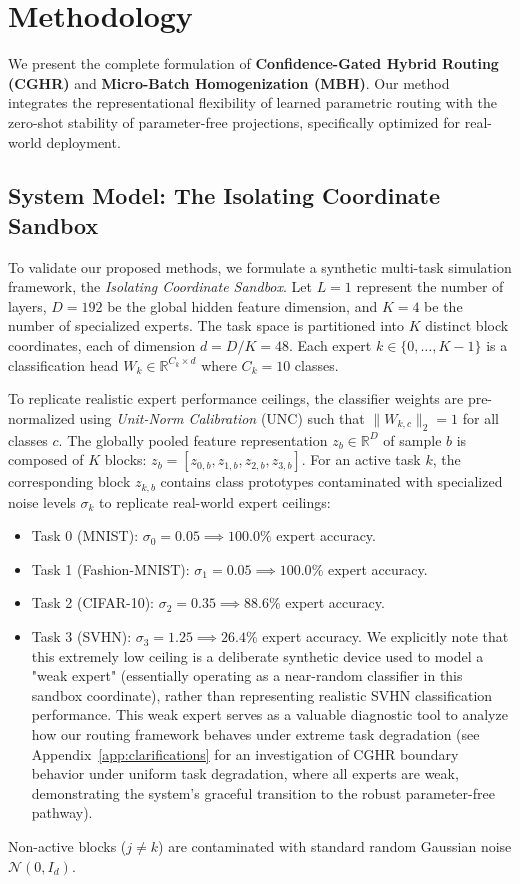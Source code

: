 \section{Methodology}
\label{sec:method}

We present the complete formulation of \textbf{Confidence-Gated Hybrid Routing (CGHR)} and \textbf{Micro-Batch Homogenization (MBH)}. Our method integrates the representational flexibility of learned parametric routing with the zero-shot stability of parameter-free projections, specifically optimized for real-world deployment.

\subsection{System Model: The Isolating Coordinate Sandbox}
To validate our proposed methods, we formulate a synthetic multi-task simulation framework, the \emph{Isolating Coordinate Sandbox}. Let $L=1$ represent the number of layers, $D=192$ be the global hidden feature dimension, and $K=4$ be the number of specialized experts. The task space is partitioned into $K$ distinct block coordinates, each of dimension $d = D/K = 48$. Each expert $k \in \{0, \dots, K-1\}$ is a classification head $W_k \in \mathbb{R}^{C_k \times d}$ where $C_k = 10$ classes.

To replicate realistic expert performance ceilings, the classifier weights are pre-normalized using \emph{Unit-Norm Calibration} (UNC) such that $\|W_{k, c}\|_2 = 1$ for all classes $c$. The globally pooled feature representation $z_b \in \mathbb{R}^D$ of sample $b$ is composed of $K$ blocks: $z_b = [z_{0, b}, z_{1, b}, z_{2, b}, z_{3, b}]$. For an active task $k$, the corresponding block $z_{k, b}$ contains class prototypes contaminated with specialized noise levels $\sigma_k$ to replicate real-world expert ceilings:
\begin{itemize}
    \item Task 0 (MNIST): $\sigma_0 = 0.05 \implies 100.0\%$ expert accuracy.
    \item Task 1 (Fashion-MNIST): $\sigma_1 = 0.05 \implies 100.0\%$ expert accuracy.
    \item Task 2 (CIFAR-10): $\sigma_2 = 0.35 \implies 88.6\%$ expert accuracy.
    \item Task 3 (SVHN): $\sigma_3 = 1.25 \implies 26.4\%$ expert accuracy. We explicitly note that this extremely low ceiling is a deliberate synthetic device used to model a "weak expert" (essentially operating as a near-random classifier in this sandbox coordinate), rather than representing realistic SVHN classification performance. This weak expert serves as a valuable diagnostic tool to analyze how our routing framework behaves under extreme task degradation (see Appendix~\ref{app:clarifications} for an investigation of CGHR boundary behavior under uniform task degradation, where all experts are weak, demonstrating the system's graceful transition to the robust parameter-free pathway).
\end{itemize}
Non-active blocks ($j \ne k$) are contaminated with standard random Gaussian noise $\mathcal{N}(0, I_d)$.


